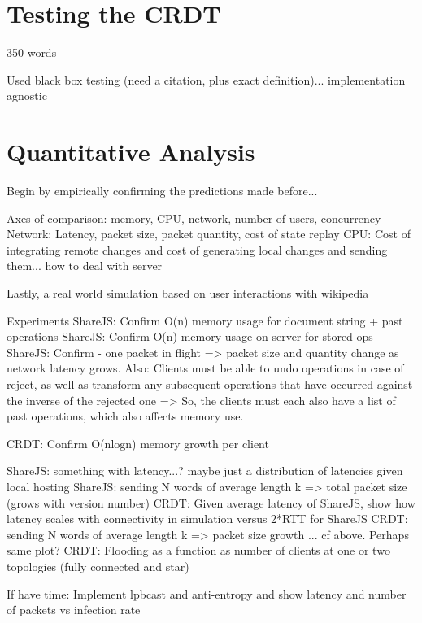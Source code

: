 \documentclass[12pt,a4paper,twoside,openright]{report}
\begin{document}
	
	
	\section{Testing the CRDT}
	350 words
	
	Used black box testing (need a citation, plus exact definition)... implementation agnostic
	
	
	\section{Quantitative Analysis}
	
		Begin by empirically confirming the predictions made before... 
		
		Axes of comparison: memory, CPU, network, number of users, concurrency
			Network: Latency, packet size, packet quantity, cost of state replay
			CPU: Cost of integrating remote changes and cost of generating local changes and sending them... how to deal with server
			
		
			
		Lastly, a real world simulation based on user interactions with wikipedia
		
		
		Experiments
			ShareJS: Confirm O(n) memory usage for document string + past operations
			ShareJS: Confirm O(n) memory usage on server for stored ops
			ShareJS: Confirm - one packet in flight => packet size and quantity change as network latency grows. 
						Also: Clients must be able to undo operations in case of reject, as well as transform any subsequent operations that have occurred against the inverse of the rejected one => So, the clients must each also have a list of past operations, which also affects memory use.
						
			CRDT:	 Confirm O(nlogn) memory growth per client
			
			ShareJS: something with latency...? maybe just a distribution of latencies given local hosting
			ShareJS: sending N words of average length k => total packet size (grows with version number)
			CRDT: 	 Given average latency of ShareJS, show how latency scales with connectivity in simulation versus 2*RTT for ShareJS
			CRDT:	 sending N words of average length k => packet size growth ... cf above. Perhaps same plot?
			CRDT: 	 Flooding as a function as number of clients at one or two topologies (fully connected and star)
			
			If have time: Implement lpbcast and anti-entropy and show latency and number of packets vs infection rate
			
\end{document}
